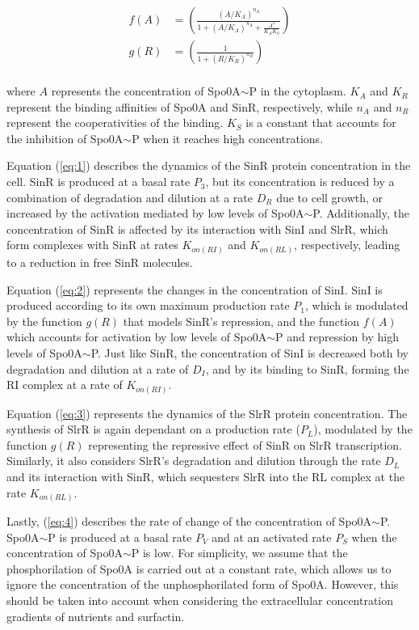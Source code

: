 \begin{align*}
    f(A) &= \left(\frac{(A/K_A)^{n_A}}{1 + (A/K_A)^{n_A}+ \frac{A^2}{K_A K_S }} \right) \\ 
    g(R) &= \left(\frac{1}{1 + (R/K_R)^{n_R}}\right) \\
\end{align*}  

where $A$ represents the concentration of Spo0A$\sim$P in the cytoplasm. \(K_{A}\) and \(K_R\) represent
 the binding affinities of Spo0A and SinR, respectively, while \(n_A\) and \(n_R\) represent 
 the cooperativities of the binding. \(K_S\) is a constant that accounts for the inhibition of Spo0A$\sim$P 
 when it reaches high concentrations.

Equation (\ref{eq:1}) describes the dynamics of the SinR protein concentration in the cell. SinR is 
produced at a basal rate $P_3$, but its concentration is reduced by a combination of degradation and dilution 
at a rate $D_R$ due to cell growth, or 
increased by the activation mediated by low levels of Spo0A$\sim$P.
Additionally, the concentration of SinR is affected by its interaction with SinI and SlrR, which form complexes with SinR at rates $K_{on(RI)}$ and $K_{on(RL)}$, respectively, leading to a reduction in free SinR molecules.

Equation (\ref{eq:2}) represents the changes in the concentration of SinI. SinI is produced according to its own maximum production rate $P_1$, which is modulated by the function $g(R)$ that models SinR's repression, and the
 function $f(A)$ which accounts for activation by low levels of Spo0A$\sim$P and repression by high 
 levels of Spo0A$\sim$P. Just like SinR, the concentration of SinI is decreased both by degradation and dilution at a rate of $D_I$, and by its binding to SinR, forming the RI complex at a rate of $K_{on(RI)}$.

Equation (\ref{eq:3}) represents the dynamics of the SlrR protein concentration. 
The synthesis of SlrR is again dependant on a production rate ($P_L$), modulated by the function $g(R)$ representing the repressive effect of SinR on SlrR transcription. Similarly, it also considers SlrR's degradation and dilution through the rate $D_L$ and its interaction with SinR, which sequesters SlrR into the RL complex at the rate $K_{on(RL)}$.

Lastly, (\ref{eq:4}) describes the rate of change of the concentration of Spo0A$\sim$P. Spo0A$\sim$P
is produced at a basal rate $P_V$ and at an activated rate $P_S$ when the concentration of Spo0A$\sim$P is low. For
simplicity, we assume that the phosphorilation of Spo0A is carried out at a constant rate, which allows us
to ignore the concentration of the unphosphorilated form of Spo0A. However, this should be taken into account
when considering the extracellular concentration gradients of nutrients and surfactin.

